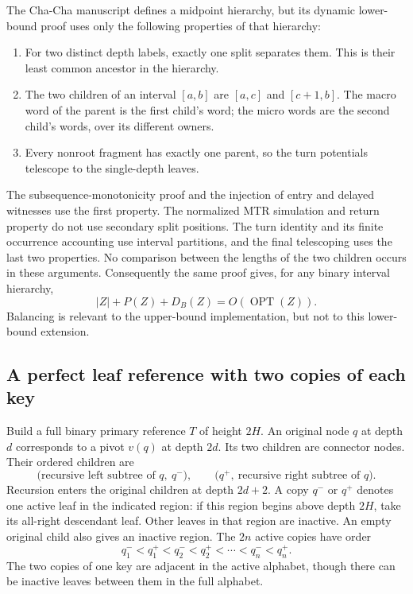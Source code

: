\documentclass[11pt]{article}
\numberwithin{equation}{section}
\newcommand{\OPT}{\operatorname{OPT}}
\begin{document}
The Cha-Cha manuscript defines a midpoint hierarchy, but its
dynamic lower-bound proof uses only the following properties of that
hierarchy:
\begin{enumerate}
\item For two distinct depth labels, exactly one split separates them.
This is their least common ancestor in the hierarchy.
\item The two children of an interval $[a,b]$ are $[a,c]$ and
$[c+1,b]$. The macro word of the parent is the first child's word;
the micro words are the second child's words, over its different owners.
\item Every nonroot fragment has exactly one parent, so the turn
potentials telescope to the single-depth leaves.
\end{enumerate}
The subsequence-monotonicity proof and the injection of entry and delayed
witnesses use the first property. The normalized MTR simulation and
return property do not use secondary split positions. The turn identity
and its finite occurrence accounting use interval partitions, and the
final telescoping uses the last two properties. No comparison between
the lengths of the two children occurs in these arguments.
Consequently the same proof gives, for any binary interval hierarchy,
\begin{equation}\label{end:eq:lower}
 |Z|+P(Z)+D_B(Z)=O(\OPT(Z)).
\end{equation}
Balancing is relevant to the upper-bound implementation, but not to this
lower-bound extension.

\subsection{A perfect leaf reference with two copies of each key}

Build a full binary primary reference $T$ of height $2H$. An original
node $q$ at depth $d$ corresponds to a pivot $v(q)$ at depth $2d$.
Its two children are connector nodes. Their ordered children are
\[
 \bigl(\text{recursive left subtree of }q,\ q^-\bigr),
 \qquad
 \bigl(q^+,\ \text{recursive right subtree of }q\bigr).
\]
Recursion enters the original children at depth $2d+2$. A copy $q^-$
or $q^+$ denotes one active leaf in the indicated region: if this
region begins above depth $2H$, take its all-right descendant leaf.
Other leaves in that region are inactive. An empty original child
also gives an inactive region. The $2n$ active copies have order
\[
 q_1^-<q_1^+<q_2^-<q_2^+<\cdots<q_n^-<q_n^+.
\]
The two copies of one key are adjacent in the active alphabet, though
there can be inactive leaves between them in the full alphabet.
\end{document}
